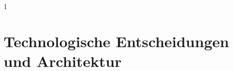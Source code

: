 \graphicspath{{sections/chapters/02-technologien/images/}}

\begin{spacing}{1}
\chapter{Technologische Entscheidungen und Architektur}
\end{spacing}








